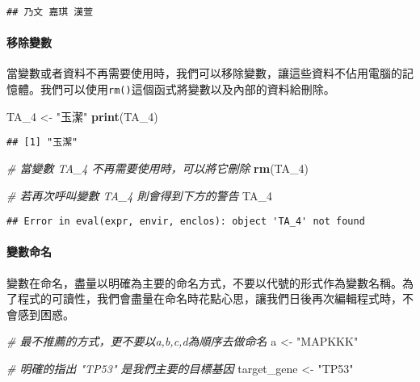 \documentclass[]{article}
\newenvironment{Shaded}{\begin{snugshade}}{\end{snugshade}}
\newcommand{\KeywordTok}[1]{\textcolor[rgb]{0.13,0.29,0.53}{\textbf{{#1}}}}
\newcommand{\StringTok}[1]{\textcolor[rgb]{0.31,0.60,0.02}{{#1}}}
\newcommand{\CommentTok}[1]{\textcolor[rgb]{0.56,0.35,0.01}{\textit{{#1}}}}
\newcommand{\NormalTok}[1]{{#1}}
\let\oldparagraph\paragraph
\renewcommand{\paragraph}[1]{\oldparagraph{#1}\mbox{}}
\begin{document}
\begin{verbatim}
## 乃文 嘉琪 漢萱
\end{verbatim}

\paragraph{移除變數}

當變數或者資料不再需要使用時，我們可以移除變數，讓這些資料不佔用電腦的記憶體。我們可以使用\texttt{rm()}這個函式將變數以及內部的資料給刪除。

\begin{Shaded}
\begin{Highlighting}[]
\NormalTok{TA_4 <-}\StringTok{ "玉潔"}
\KeywordTok{print}\NormalTok{(TA_4)}
\end{Highlighting}
\end{Shaded}

\begin{verbatim}
## [1] "玉潔"
\end{verbatim}

\begin{Shaded}
\begin{Highlighting}[]
\CommentTok{# 當變數 TA_4 不再需要使用時，可以將它刪除}
\KeywordTok{rm}\NormalTok{(TA_4)}

\CommentTok{# 若再次呼叫變數 TA_4 則會得到下方的警告}
\NormalTok{TA_4}
\end{Highlighting}
\end{Shaded}

\begin{verbatim}
## Error in eval(expr, envir, enclos): object 'TA_4' not found
\end{verbatim}

\paragraph{變數命名}

變數在命名，盡量以明確為主要的命名方式，不要以代號的形式作為變數名稱。為了程式的可讀性，我們會盡量在命名時花點心思，讓我們日後再次編輯程式時，不會感到困惑。

\begin{Shaded}
\begin{Highlighting}[]
\CommentTok{# 最不推薦的方式，更不要以a,b,c,d為順序去做命名}
\NormalTok{a <-}\StringTok{ "MAPKKK"}

\CommentTok{# 明確的指出 "TP53" 是我們主要的目標基因}
\NormalTok{target_gene <-}\StringTok{ "TP53"}
\end{Highlighting}
\end{Shaded}
\end{document}
